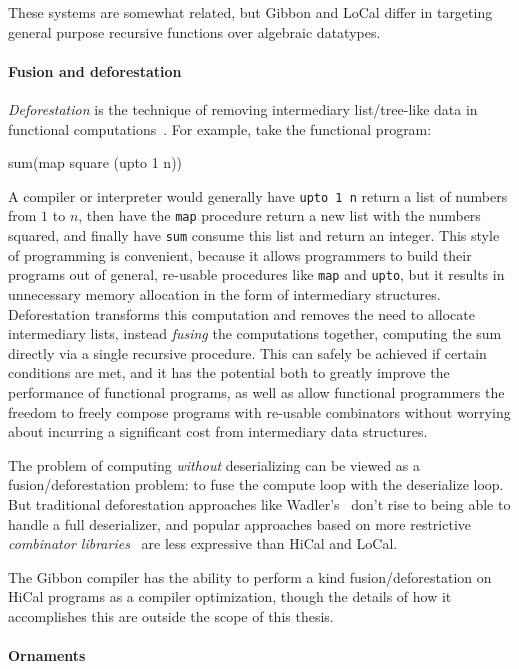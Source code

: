 \documentclass[showabstract,showacknowledgments,showpreface,showdedication,school]{iuphd}
\theoremstyle{nonumberplain}
\newcommand{\sysname}[0]{LoCal\xspace}
\newcommand{\ourcalc}[0]{\sysname}
\newcommand{\lamadt} [0]{HiCal\xspace}
\newcommand{\il}[1]{\lstinline[style=inline,mathescape=true];#1;}
\begin{document}
These systems are somewhat related, but Gibbon and \ourcalc{} differ in
targeting general purpose recursive functions over algebraic datatypes.



\paragraph{Fusion and deforestation}

\emph{Deforestation} is the technique of removing intermediary list/tree-like
data in functional computations~\cite{wadler-deforestation}.
For example, take the functional program:
\begin{code}
  sum(map square (upto 1 n))
\end{code}
A compiler or interpreter would generally have \il{upto 1 n} return a list of
numbers from $1$ to $n$, then have the \il{map} procedure return a new list with
the numbers squared, and finally have \il{sum} consume this list and return an
integer. This style of programming is convenient, because it allows programmers
to build their programs out of general, re-usable procedures like \il{map} and
\il{upto}, but it results in unnecessary memory allocation in the form of
intermediary structures. Deforestation transforms this computation and removes
the need to allocate intermediary lists, instead \emph{fusing} the computations
together, computing the sum directly via a single recursive procedure. This can
safely be achieved if certain conditions are met, and it has the potential both
to greatly improve the performance of functional programs, as well as allow
functional programmers the freedom to freely compose programs with re-usable
combinators without worrying about incurring a significant cost from
intermediary data structures.

The problem of computing \emph{without} deserializing can be viewed as a
fusion/deforestation problem: to fuse the compute loop with the deserialize
loop. But traditional deforestation approaches like
Wadler's~\cite{wadler-deforestation} don't rise to being able to handle a full
deserializer, and popular approaches based on more restrictive \emph{combinator
libraries}~\cite{stream-fusion} are less expressive than \lamadt{} and
\ourcalc{}.

The Gibbon compiler has the ability to perform a kind fusion/deforestation on
\lamadt{} programs as a compiler optimization, though the details of how it
accomplishes this are outside the scope of this thesis.

\paragraph{Ornaments}
\end{document}
